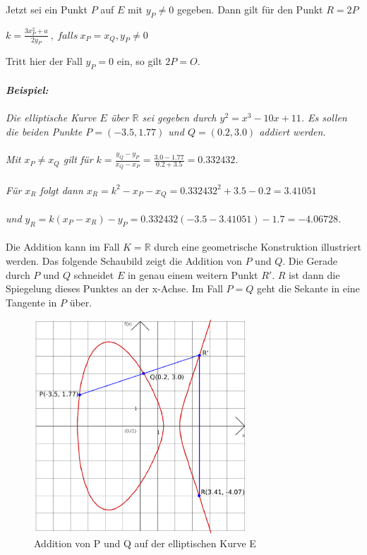 \documentclass[10pt, bigheadings]{scrartcl}
\begin{document}
Jetzt sei ein Punkt $P$ auf $E$ mit $y_P \neq 0$ gegeben. Dann gilt für den 
Punkt  $R=2P$
\begin{center} 
$k=\frac{3x_P^2+a}{2y_P}\ ,\ falls\ x_P = x_Q,y_P \neq 0$
\end{center}
Tritt hier der Fall $y_P = 0$ ein, so gilt $2P = O$.\\\\
{\it
\textbf{Beispiel:}\\\\
Die elliptische Kurve $E$ über $\mathbb R$ sei gegeben durch $y^2 = x^3-10x+11$.
Es sollen die beiden Punkte $P=(-3.5,1.77)$ und $Q=(0.2,3.0)$ addiert werden.\\\\ 
Mit $x_P \neq x_Q$ gilt für  
$k=\frac{y_Q-y_P}{x_Q-x_P} = \frac{3.0 - 1.77}{0.2 + 3.5} = 0.332432 $.\\\\
Für $x_R$ folgt dann $x_R = k^2-x_P-x_Q = 0.332432^2 + 3.5 - 0.2 = 3.41051$\\\\
und $y_R = k(x_P - x_R) - y_P = 0.332432(-3.5 - 3.41051) - 1.7 = -4.06728$.
}\\\\
Die Addition kann im Fall $K = \mathbb R$ durch eine geometrische Konstruktion
illustriert werden. Das folgende Schaubild zeigt die Addition von $P$ und $Q$.
Die Gerade durch $P$ und $Q$ schneidet $E$ in genau einem 
weitern Punkt $R'$. $R$ ist dann die Spiegelung dieses Punktes an der x-Achse. 
Im Fall $P=Q$ geht die Sekante in eine Tangente in $P$ über. 
\begin{figure}[ht]
\begin{center}
\includegraphics[width=8cm]{ec-2.eps}
\caption{Addition von P und Q auf der elliptischen Kurve E}
\end{center}
\end{figure}
\end{document}
